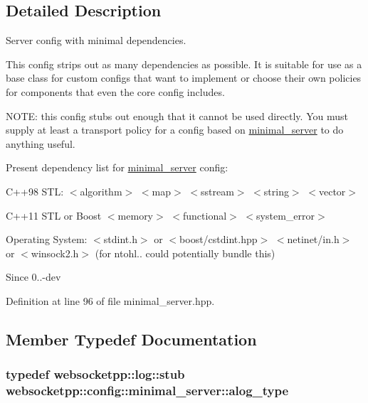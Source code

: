 \subsection{Detailed Description}
Server config with minimal dependencies. 

This config strips out as many dependencies as possible. It is suitable for use as a base class for custom configs that want to implement or choose their own policies for components that even the core config includes.

N\+O\+T\+E\+: this config stubs out enough that it cannot be used directly. You must supply at least a transport policy for a config based on {\ttfamily \hyperlink{structwebsocketpp_1_1config_1_1minimal__server}{minimal\+\_\+server}} to do anything useful.

Present dependency list for \hyperlink{structwebsocketpp_1_1config_1_1minimal__server}{minimal\+\_\+server} config\+:

C++98 S\+T\+L\+: $<$algorithm$>$ $<$map$>$ $<$sstream$>$ $<$string$>$ $<$vector$>$

C++11 S\+T\+L or Boost $<$memory$>$ $<$functional$>$ $<$system\+\_\+error$>$

Operating System\+: $<$stdint.\+h$>$ or $<$boost/cstdint.\+hpp$>$ $<$netinet/in.\+h$>$ or $<$winsock2.\+h$>$ (for ntohl.. could potentially bundle this)

\begin{DoxySince}{Since}
0..-\/dev 
\end{DoxySince}


Definition at line 96 of file minimal\+\_\+server.\+hpp.



\subsection{Member Typedef Documentation}
\hypertarget{structwebsocketpp_1_1config_1_1minimal__server_a9296068cfeabe4786e08691cd755f9b3}{}
\subsubsection[{alog\+\_\+type}]{\setlength{\rightskip}{0pt plus 5cm}typedef {\bf websocketpp\+::log\+::stub} {\bf websocketpp\+::config\+::minimal\+\_\+server\+::alog\+\_\+type}}\label{structwebsocketpp_1_1config_1_1minimal__server_a9296068cfeabe4786e08691cd755f9b3}



